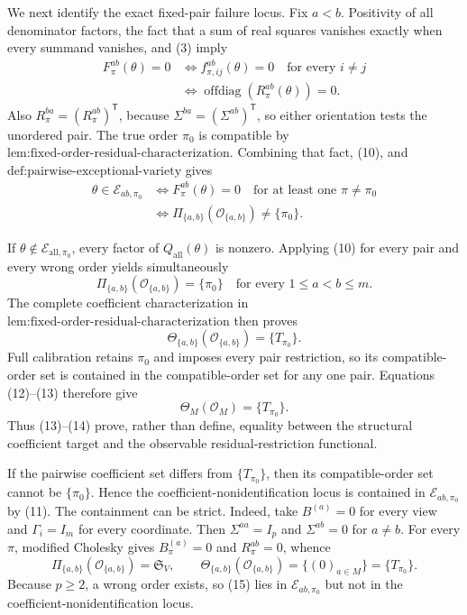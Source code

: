 We next identify the exact fixed-pair failure locus.  Fix \(a<b\).  Positivity of all denominator factors, the fact that a sum of real squares vanishes exactly when every summand vanishes, and (3) imply
\[
\begin{aligned}
F_\pi^{ab}(\theta)=0
&\Longleftrightarrow f_{\pi,ij}^{ab}(\theta)=0
\quad\text{for every }i\ne j\\
&\Longleftrightarrow \operatorname{offdiag}(R_\pi^{ab}(\theta))=0.
\end{aligned}
\tag{10}
\]
Also \(R_\pi^{ba}=(R_\pi^{ab})^{\mathsf T}\), because \(\Sigma^{ba}=(\Sigma^{ab})^{\mathsf T}\), so either orientation tests the unordered pair.  The true order \(\pi_0\) is compatible by \(\text{lem:fixed-order-residual-characterization}\).  Combining that fact, (10), and \(\text{def:pairwise-exceptional-variety}\) gives
\[
\begin{aligned}
\theta\in\mathcal E_{ab,\pi_0}
&\Longleftrightarrow
F_\pi^{ab}(\theta)=0\quad\text{for at least one }\pi\ne\pi_0\\
&\Longleftrightarrow
\Pi_{\{a,b\}}(\mathcal O_{\{a,b\}})\ne\{\pi_0\}.
\end{aligned}
\tag{11}
\]

If \(\theta\notin\mathcal E_{\mathrm{all},\pi_0}\), every factor of \(Q_{\mathrm{all}}(\theta)\) is nonzero.  Applying (10) for every pair and every wrong order yields simultaneously
\[
\Pi_{\{a,b\}}(\mathcal O_{\{a,b\}})=\{\pi_0\}
\quad\text{for every }1\le a<b\le m.
\tag{12}
\]
The complete coefficient characterization in \(\text{lem:fixed-order-residual-characterization}\) then proves
\[
\Theta_{\{a,b\}}(\mathcal O_{\{a,b\}})=\{T_{\pi_0}\}.
\tag{13}
\]
Full calibration retains \(\pi_0\) and imposes every pair restriction, so its compatible-order set is contained in the compatible-order set for any one pair.  Equations (12)--(13) therefore give
\[
\Theta_M(\mathcal O_M)=\{T_{\pi_0}\}.
\tag{14}
\]
Thus (13)--(14) prove, rather than define, equality between the structural coefficient target and the observable residual-restriction functional.

If the pairwise coefficient set differs from \(\{T_{\pi_0}\}\), then its compatible-order set cannot be \(\{\pi_0\}\).  Hence the coefficient-nonidentification locus is contained in \(\mathcal E_{ab,\pi_0}\) by (11).  The containment can be strict.  Indeed, take \(B^{(a)}=0\) for every view and \(\Gamma_i=I_m\) for every coordinate.  Then \(\Sigma^{aa}=I_p\) and \(\Sigma^{ab}=0\) for \(a\ne b\).  For every \(\pi\), modified Cholesky gives \(B_\pi^{(a)}=0\) and \(R_\pi^{ab}=0\), whence
\[
\Pi_{\{a,b\}}(\mathcal O_{\{a,b\}})=\mathfrak S_V,
\qquad
\Theta_{\{a,b\}}(\mathcal O_{\{a,b\}})
=\{(0)_{a\in M}\}=\{T_{\pi_0}\}.
\tag{15}
\]
Because \(p\ge2\), a wrong order exists, so (15) lies in \(\mathcal E_{ab,\pi_0}\) but not in the coefficient-nonidentification locus.

